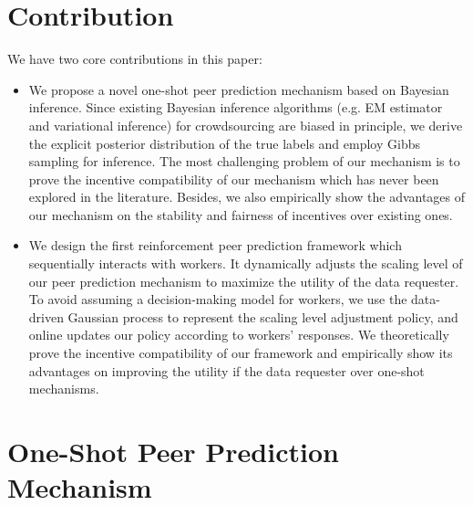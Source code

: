 \documentclass{article}
\begin{document}
\section{Contribution}
We have two core contributions in this paper:
\begin{itemize}
\item We propose a novel one-shot peer prediction mechanism based on Bayesian inference. Since existing Bayesian inference algorithms (e.g. EM estimator and variational inference) for crowdsourcing are biased in principle, we derive the explicit posterior distribution of the true labels and employ Gibbs sampling for inference. The most challenging problem of our mechanism is to prove the incentive compatibility of our mechanism which has never been explored in the literature. Besides, we also empirically show the advantages of our mechanism on the stability and fairness of incentives over existing ones.
\item We design the first reinforcement peer prediction framework which sequentially interacts with workers. It dynamically adjusts the scaling level of our peer prediction mechanism to maximize the utility of the data requester. To avoid assuming a decision-making model for workers, we use the data-driven Gaussian process to represent the scaling level adjustment policy, and online updates our policy according to workers' responses. We theoretically prove the incentive compatibility of our framework and empirically show its advantages on improving the utility if the data requester over one-shot mechanisms.
\end{itemize}

\section{One-Shot Peer Prediction Mechanism}
\end{document}
